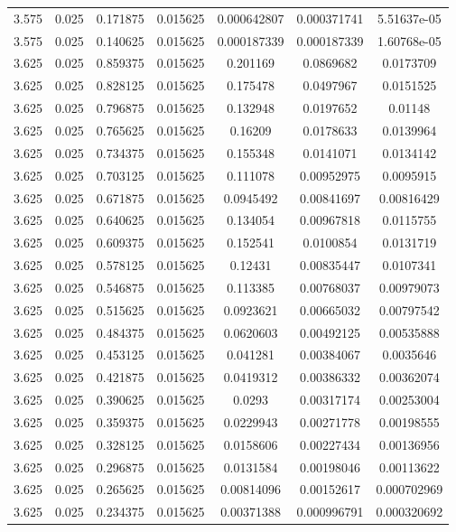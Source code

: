 \begin{flushleft}
\begin{longtable}{ccccccc}
3.575 & 0.025 & 0.171875 & 0.015625 & 0.000642807 & 0.000371741 & 5.51637e-05  \\ 
3.575 & 0.025 & 0.140625 & 0.015625 & 0.000187339 & 0.000187339 & 1.60768e-05  \\ 
3.625 & 0.025 & 0.859375 & 0.015625 & 0.201169 & 0.0869682 & 0.0173709  \\ 
3.625 & 0.025 & 0.828125 & 0.015625 & 0.175478 & 0.0497967 & 0.0151525  \\ 
3.625 & 0.025 & 0.796875 & 0.015625 & 0.132948 & 0.0197652 & 0.01148  \\ 
3.625 & 0.025 & 0.765625 & 0.015625 & 0.16209 & 0.0178633 & 0.0139964  \\ 
3.625 & 0.025 & 0.734375 & 0.015625 & 0.155348 & 0.0141071 & 0.0134142  \\ 
3.625 & 0.025 & 0.703125 & 0.015625 & 0.111078 & 0.00952975 & 0.0095915  \\ 
3.625 & 0.025 & 0.671875 & 0.015625 & 0.0945492 & 0.00841697 & 0.00816429  \\ 
3.625 & 0.025 & 0.640625 & 0.015625 & 0.134054 & 0.00967818 & 0.0115755  \\ 
3.625 & 0.025 & 0.609375 & 0.015625 & 0.152541 & 0.0100854 & 0.0131719  \\ 
3.625 & 0.025 & 0.578125 & 0.015625 & 0.12431 & 0.00835447 & 0.0107341  \\ 
3.625 & 0.025 & 0.546875 & 0.015625 & 0.113385 & 0.00768037 & 0.00979073  \\ 
3.625 & 0.025 & 0.515625 & 0.015625 & 0.0923621 & 0.00665032 & 0.00797542  \\ 
3.625 & 0.025 & 0.484375 & 0.015625 & 0.0620603 & 0.00492125 & 0.00535888  \\ 
3.625 & 0.025 & 0.453125 & 0.015625 & 0.041281 & 0.00384067 & 0.0035646  \\ 
3.625 & 0.025 & 0.421875 & 0.015625 & 0.0419312 & 0.00386332 & 0.00362074  \\ 
3.625 & 0.025 & 0.390625 & 0.015625 & 0.0293 & 0.00317174 & 0.00253004  \\ 
3.625 & 0.025 & 0.359375 & 0.015625 & 0.0229943 & 0.00271778 & 0.00198555  \\ 
3.625 & 0.025 & 0.328125 & 0.015625 & 0.0158606 & 0.00227434 & 0.00136956  \\ 
3.625 & 0.025 & 0.296875 & 0.015625 & 0.0131584 & 0.00198046 & 0.00113622  \\ 
3.625 & 0.025 & 0.265625 & 0.015625 & 0.00814096 & 0.00152617 & 0.000702969  \\ 
3.625 & 0.025 & 0.234375 & 0.015625 & 0.00371388 & 0.000996791 & 0.000320692  \\ 

\end{longtable}
\end{flushleft}
